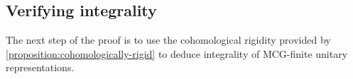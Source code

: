 %
%
\subsection{Verifying integrality}
\label{subsection:integrality}

The next step of the proof is to use the cohomological rigidity provided by
\autoref{proposition:cohomologically-rigid} to deduce integrality of MCG-finite unitary representations.

